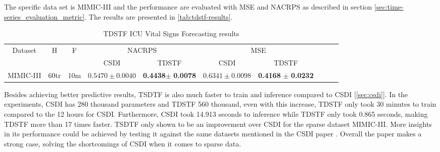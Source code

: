 The specific data set is MIMIC-III \cite{johnson_mimic-iii_2015} and the performance are evaluated with MSE and NACRPS as described in section \ref{sec:time-series_evaluation_metric}. The results are presented in \autoref{tab:tdstf-results}.

\begin{table}[ht]
    \centering
    \begin{tabular}{cccccccccc}
        \toprule
        \multirow{2}{*}{Dataset} & \multirow{2}{*}{H} & \multirow{2}{*}{F} & \multicolumn{2}{c}{NACRPS} & \multicolumn{2}{c}{MSE} \\
        \cmidrule(lr){4-5} \cmidrule(lr){6-7}
         & & & CSDI & TDSTF & CSDI & TDSTF \\
        \midrule
        \multirow{1}{*}{MIMIC-III} & 60tr  & 10m  & $0.5470 \pm 0.0040$ & \textbf{0.4438}$\pm$ \textbf{0.0078} & $0.6341 \pm 0.0098$ & \textbf{0.4168} $\pm$ \textbf{0.0232} \\
        \bottomrule
    \end{tabular}
    \caption{TDSTF ICU Vital Signs Forecasting results \cite{chang_tdstf_2023}}
    \label{tab:tdstf-results}
\end{table}

Besides achieving better predictive results, TSDTF is also much faster to train and inference compared to CSDI [\ref{sec:csdi}]. In the experiments, CSDI has 280 thousand parameters and TDSTF 560 thousand, even with this increase, TDSTF only took 30 minutes to train compared to the 12 hours for CSDI. Furthermore, CSDI took 14.913 seconds to inference while TDSTF only took 0.865 seconds, making TDSTF more than 17 times faster.
TSDTF only shown to be an improvement over CSDI for the sparse dataset MIMIC-III. More insights in its performance could be achieved by testing it against the same datasets mentioned in the CSDI paper \cite{tashiro_csdi_2021}. Overall the paper makes a strong case, solving the shortcomings of CSDI when it comes to sparse data.